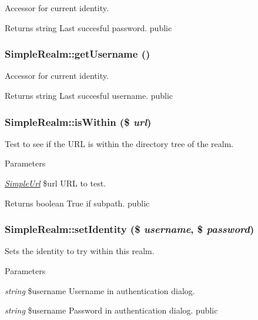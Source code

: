\label{class_simple_realm_a983a28e44171457f617582d877b94ea8}
Accessor for current identity. \begin{DoxyReturn}{Returns}
string Last succesful password.  public 
\end{DoxyReturn}
\hypertarget{class_simple_realm_a7493447585e5c5bccbcc4207ec117e81}{
\subsubsection[{getUsername}]{\setlength{\rightskip}{0pt plus 5cm}SimpleRealm::getUsername ()}}
\label{class_simple_realm_a7493447585e5c5bccbcc4207ec117e81}
Accessor for current identity. \begin{DoxyReturn}{Returns}
string Last succesful username.  public 
\end{DoxyReturn}
\hypertarget{class_simple_realm_a64076eacf3613b1f68b43b5e5d404391}{
\subsubsection[{isWithin}]{\setlength{\rightskip}{0pt plus 5cm}SimpleRealm::isWithin (\$ {\em url})}}
\label{class_simple_realm_a64076eacf3613b1f68b43b5e5d404391}
Test to see if the URL is within the directory tree of the realm. 
\begin{DoxyParams}{Parameters}
\item[{\em \hyperlink{class_simple_url}{SimpleUrl}}]\$url URL to test. \end{DoxyParams}
\begin{DoxyReturn}{Returns}
boolean True if subpath.  public 
\end{DoxyReturn}
\hypertarget{class_simple_realm_aeddea8991cfb570150e5f42499da6819}{
\subsubsection[{setIdentity}]{\setlength{\rightskip}{0pt plus 5cm}SimpleRealm::setIdentity (\$ {\em username}, \/  \$ {\em password})}}
\label{class_simple_realm_aeddea8991cfb570150e5f42499da6819}
Sets the identity to try within this realm. 
\begin{DoxyParams}{Parameters}
\item[{\em string}]\$username Username in authentication dialog. \item[{\em string}]\$username Password in authentication dialog.  public \end{DoxyParams}
